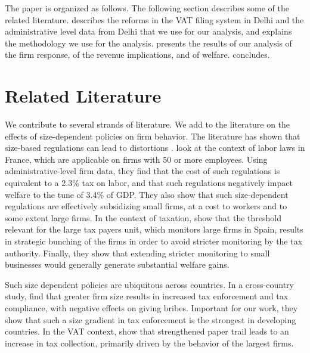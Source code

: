 The paper is organized as follows. The following section describes some of the related literature.  describes the reforms in the VAT filing system in Delhi and the administrative level data from Delhi that we use for our analysis, and explains the methodology we use for the analysis.  presents the results of our analysis of the firm response, of the revenue implications, and of welfare.  concludes.

\section{Related Literature}
\label{sec:3-related-literature}


We contribute to several strands of literature. We add to the literature on the effects of size-dependent policies on firm behavior. The literature has shown that size-based regulations can lead to distortions \citep{gollin1995taxes,guner2008macroeconomic}. \citet{garicano2016firm} look at the context of labor laws in France, which are applicable on firms with 50 or more employees. Using administrative-level firm data, they find that the cost of such regulations is equivalent to a 2.3\% tax on labor, and that such regulations negatively impact welfare to the tune of 3.4\% of GDP. They also show that such size-dependent regulations are effectively subsidizing small firms, at a cost to workers and to some extent large firms. In the context of taxation, \citet{almunia2018under} show that the threshold relevant for the large tax payers unit, which monitors large firms in Spain, results in strategic bunching of the firms in order to avoid stricter monitoring by the tax authority. Finally, they show that extending stricter monitoring to small businesses would generally generate substantial welfare gains.

Such size dependent policies are ubiquitous across countries. In a cross-country study, \citet{bachas2017size} find that greater firm size results in increased tax enforcement and tax compliance, with negative effects on giving bribes. Important for our work, they show that such a size gradient in tax enforcement is the strongest in developing countries. In the VAT context, \citet{mittal2017vat} show that strengthened paper trail leads to an increase in tax collection, primarily driven by the behavior of the largest firms. 

